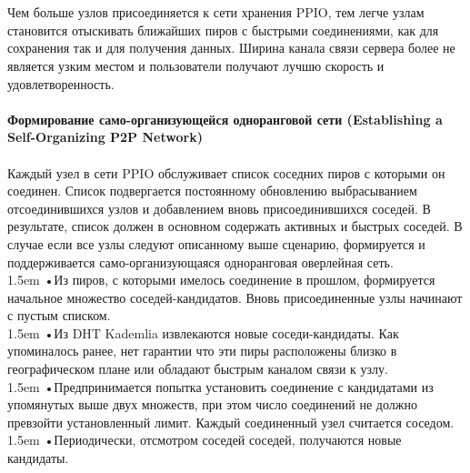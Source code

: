 \documentclass[10pt,a4paper]{article}
\begin{document}
\vspace{-0.5em}
\\ \\Чем больше узлов присоединяется к сети хранения PPIO, тем легче узлам становится отыскивать ближайших пиров с быстрыми соединениями, как для сохранения так и для получения данных. Ширина канала связи сервера более не является узким местом и пользователи получают лучшю скорость и удовлетворенность.
\vspace{-0.5em}
\\ \\{\bf Формирование само-организующейся одноранговой сети (Establishing a Self-Organizing P2P Network)}
\vspace{-0.5em}
\\ \\Каждый узел в сети PPIO обслуживает список соседних пиров с которыми он соединен. Список подвергается постоянному обновлению выбрасыванием отсоединившихся узлов и добавлением вновь присоединившихся соседей. В результате, список должен в основном содержать активных и быстрых соседей. В случае если все узлы следуют описанному выше сценарию, формируется и поддерживается само-организующаяся одноранговая оверлейная сеть.
\vspace{-0.8em}
\\

\hangindent 1.5em
\noindent   
•\quad Из пиров, с которыми имелось соединение в прошлом, формируется начальное множество соседей-кандидатов. Вновь присоединенные узлы начинают с пустым списком.
\vspace{-0.8em}
\\

\hangindent 1.5em
\noindent   
•\quad Из DHT Kademlia извлекаются новые соседи-кандидаты. Как упоминалось ранее, нет гарантии что эти пиры расположены близко в географическом плане или обладают быстрым каналом связи к узлу.
\vspace{-0.8em}
\\

\hangindent 1.5em
\noindent   
•\quad Предпринимается попытка установить соединение с кандидатами из упомянутых выше двух множеств, при этом число соединений не должно превзойти установленный лимит. Каждый соединенный узел считается соседом.
\vspace{-0.8em}
\\

\hangindent 1.5em
\noindent   
•\quad Периодически, отсмотром соседей соседей, получаются новые кандидаты.
\vspace{-0.8em}
\\
\end{document}
